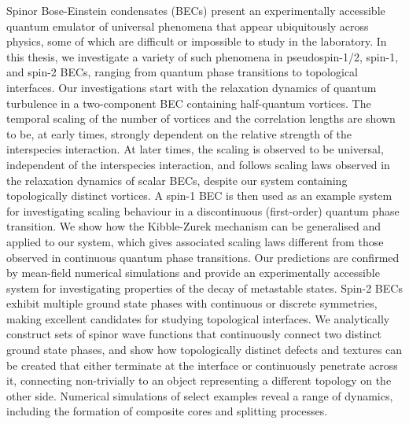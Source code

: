 Spinor Bose-Einstein condensates (BECs) present an experimentally accessible
quantum emulator of universal phenomena that appear ubiquitously across physics,
some of which are difficult or impossible to study in the laboratory.
In this thesis, we investigate a variety of such phenomena in pseudospin-1/2,
spin-1, and spin-2 BECs, ranging from quantum phase transitions to topological
interfaces.
Our investigations start with the relaxation dynamics of quantum turbulence in a
two-component BEC containing half-quantum vortices.
The temporal scaling of the number of vortices and the correlation lengths are
shown to be, at early times, strongly dependent on the relative strength of the
interspecies interaction.
At later times, the scaling is observed to be universal, independent of the
interspecies interaction, and follows scaling laws observed in the relaxation
dynamics of scalar BECs, despite our system containing topologically distinct
vortices.
A spin-1 BEC is then used as an example system for investigating scaling
behaviour in a discontinuous (first-order) quantum phase transition.
We show how the Kibble-Zurek mechanism can be generalised and applied to our
system, which gives associated scaling laws different from those observed in
continuous quantum phase transitions.
Our predictions are confirmed by mean-field numerical simulations and provide an
experimentally accessible system for investigating properties of the decay of
metastable states.
Spin-2 BECs exhibit multiple ground state phases with continuous or discrete
symmetries, making excellent candidates for studying topological interfaces.
We analytically construct sets of spinor wave functions that continuously
connect two distinct ground state phases, and show how topologically distinct
defects and textures can be created that either terminate at the interface or
continuously penetrate across it, connecting non-trivially to an object
representing a different topology on the other side.
Numerical simulations of select examples reveal a range of dynamics, including
the formation of composite cores and splitting processes.